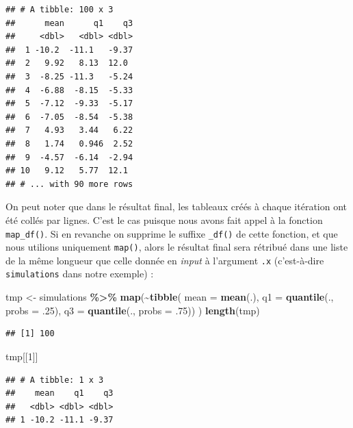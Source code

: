\documentclass[
  11pt,
]{book}
\newenvironment{Shaded}{\begin{snugshade}}{\end{snugshade}}
\newcommand{\DataTypeTok}[1]{\textcolor[rgb]{0.13,0.29,0.53}{#1}}
\newcommand{\DecValTok}[1]{\textcolor[rgb]{0.00,0.00,0.81}{#1}}
\newcommand{\FloatTok}[1]{\textcolor[rgb]{0.00,0.00,0.81}{#1}}
\newcommand{\KeywordTok}[1]{\textcolor[rgb]{0.13,0.29,0.53}{\textbf{#1}}}
\newcommand{\NormalTok}[1]{#1}
\newcommand{\OperatorTok}[1]{\textcolor[rgb]{0.81,0.36,0.00}{\textbf{#1}}}
\newcommand{\StringTok}[1]{\textcolor[rgb]{0.31,0.60,0.02}{#1}}
\numberwithin{equation}{section}
\numberwithin{countremarque}{section}
\begin{document}
\begin{lstlisting}
## # A tibble: 100 x 3
##      mean      q1    q3
##     <dbl>   <dbl> <dbl>
##  1 -10.2  -11.1   -9.37
##  2   9.92   8.13  12.0 
##  3  -8.25 -11.3   -5.24
##  4  -6.88  -8.15  -5.33
##  5  -7.12  -9.33  -5.17
##  6  -7.05  -8.54  -5.38
##  7   4.93   3.44   6.22
##  8   1.74   0.946  2.52
##  9  -4.57  -6.14  -2.94
## 10   9.12   5.77  12.1 
## # ... with 90 more rows
\end{lstlisting}

On peut noter que dans le résultat final, les tableaux créés à chaque itération ont été collés par lignes. C'est le cas puisque nous avons fait appel à la fonction \texttt{map\_df()}. Si en revanche on supprime le suffixe \texttt{\_df()} de cette fonction, et que nous utilions uniquement \texttt{map()}, alors le résultat final sera rétribué dans une liste de la même longueur que celle donnée en \emph{input} à l'argument \texttt{.x} (c'est-à-dire \texttt{simulations} dans notre exemple) :

\begin{Shaded}
\begin{Highlighting}[]
\NormalTok{tmp \textless{}{-}}\StringTok{ }
\StringTok{  }\NormalTok{simulations }\OperatorTok{\%\textgreater{}\%}\StringTok{ }
\StringTok{  }\KeywordTok{map}\NormalTok{(}\OperatorTok{\textasciitilde{}}\KeywordTok{tibble}\NormalTok{(}
    \DataTypeTok{mean =} \KeywordTok{mean}\NormalTok{(.),}
    \DataTypeTok{q1 =} \KeywordTok{quantile}\NormalTok{(., }\DataTypeTok{probs =} \FloatTok{.25}\NormalTok{),}
    \DataTypeTok{q3 =} \KeywordTok{quantile}\NormalTok{(., }\DataTypeTok{probs =} \FloatTok{.75}\NormalTok{))}
\NormalTok{  )}
\KeywordTok{length}\NormalTok{(tmp)}
\end{Highlighting}
\end{Shaded}

\begin{lstlisting}
## [1] 100
\end{lstlisting}

\begin{Shaded}
\begin{Highlighting}[]
\NormalTok{tmp[[}\DecValTok{1}\NormalTok{]]}
\end{Highlighting}
\end{Shaded}

\begin{lstlisting}
## # A tibble: 1 x 3
##    mean    q1    q3
##   <dbl> <dbl> <dbl>
## 1 -10.2 -11.1 -9.37
\end{lstlisting}
\end{document}
